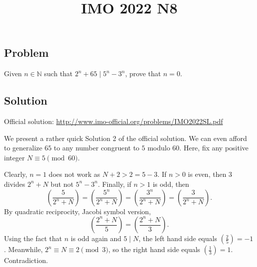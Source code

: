 \documentclass{article}
\title{IMO 2022 N8}
\author{}
\date{}
\newcommand{\N}{\mathbb{N}}
\begin{document}
\maketitle



\subsection*{Problem}

Given $n \in \N$ such that $2^n + 65 \mid 5^n - 3^n$, prove that $n = 0$.



\subsection*{Solution}

Official solution: \url{http://www.imo-official.org/problems/IMO2022SL.pdf}

We present a rather quick Solution 2 of the official solution.
We can even afford to generalize $65$ to any number congruent to $5$ modulo $60$.
Here, fix any positive integer $N \equiv 5 \pmod{60}$.

Clearly, $n = 1$ does not work as $N + 2 > 2 = 5 - 3$.
If $n > 0$ is even, then $3$ divides $2^n + N$ but not $5^n - 3^n$.
Finally, if $n > 1$ is odd, then
\[ \left(\frac{5}{2^n + N}\right) = \left(\frac{5^n}{2^n + N}\right) = \left(\frac{3^n}{2^n + N}\right) = \left(\frac{3}{2^n + N}\right). \]
By quadratic reciprocity, Jacobi symbol version,
\[ \left(\frac{2^n + N}{5}\right) = \left(\frac{2^n + N}{3}\right). \]
Using the fact that $n$ is odd again and $5 \mid N$, the left hand side equals $\left(\frac{2}{5}\right) = -1$.
Meanwhile, $2^n \equiv N \equiv 2 \pmod{3}$, so the right hand side equals $\left(\frac{1}{3}\right) = 1$.
Contradiction.
\end{document}
